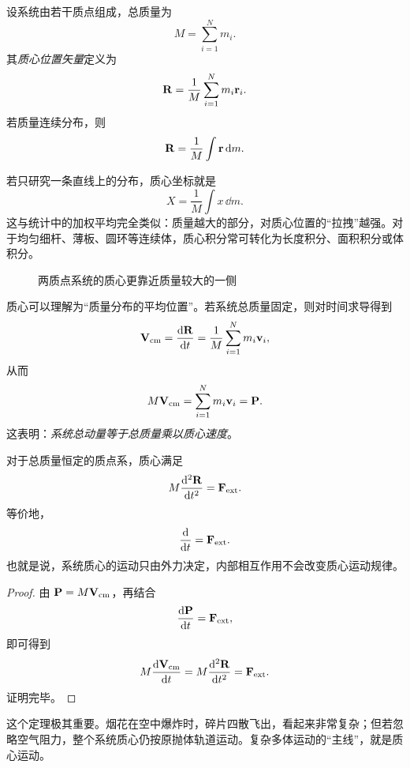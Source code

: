 \begin{definition}
设系统由若干质点组成，总质量为
\[
M=\sum_{i=1}^N m_i.
\]
其\emph{质心位置矢量}定义为
\[
\vb R=\frac{1}{M}\sum_{i=1}^N m_i\vb r_i.
\]
若质量连续分布，则
\[
\vb R=\frac{1}{M}\int \vb r\,\dd m.
\]
\end{definition}

若只研究一条直线上的分布，质心坐标就是
\[
X=\frac{1}{M}\int x\,\dd m.
\]
这与统计中的加权平均完全类似：质量越大的部分，对质心位置的“拉拽”越强。对于均匀细杆、薄板、圆环等连续体，质心积分常可转化为长度积分、面积积分或体积分。

\begin{figure}[H]
\centering
{}
\caption{两质点系统的质心更靠近质量较大的一侧}
\end{figure}

质心可以理解为“质量分布的平均位置”。若系统总质量固定，则对时间求导得到
\[
\vb V_{\text{cm}}=\dv{\vb R}{t}=\frac{1}{M}\sum_{i=1}^N m_i\vb v_i,
\]
从而
\[
M\vb V_{\text{cm}}=\sum_{i=1}^N m_i\vb v_i=\vb P.
\]
这表明：\emph{系统总动量等于总质量乘以质心速度}。

\begin{theorem}[质心运动定理]
对于总质量恒定的质点系，质心满足
\[
M\dv[2]{\vb R}{t}=\vb F_{\text{ext}}.
\]
等价地，
\[
\dv{}{t}(M\vb V_{\text{cm}})=\vb F_{\text{ext}}.
\]
也就是说，系统质心的运动只由外力决定，内部相互作用不会改变质心运动规律。
\end{theorem}

\begin{proof}
由 $\vb P=M\vb V_{\text{cm}}$，再结合
\[
\dv{\vb P}{t}=\vb F_{\text{ext}},
\]
即可得到
\[
M\dv{\vb V_{\text{cm}}}{t}=M\dv[2]{\vb R}{t}=\vb F_{\text{ext}}.
\]
证明完毕。
\end{proof}

\begin{remark}
这个定理极其重要。烟花在空中爆炸时，碎片四散飞出，看起来非常复杂；但若忽略空气阻力，整个系统质心仍按原抛体轨道运动。复杂多体运动的“主线”，就是质心运动。
\end{remark}

